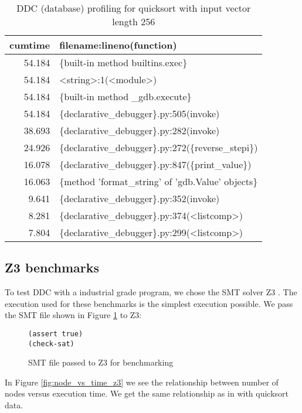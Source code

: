 \begin{table}
\caption{DDC (database) profiling for quicksort with input vector length 256}
\label{table:DDC_profile}
\begin{tabular}{rl}
cumtime & filename:lineno(function)\\
\hline
54.184 & \{built-in method builtins.exec\}\\
54.184 & <string>:1(<module>)\\
54.184 & \{built-in method \_gdb.execute\}\\
54.184 & \{declarative\_debugger\}.py:505(invoke)\\
38.693 & \{declarative\_debugger\}.py:282(invoke)\\
24.926 & \{declarative\_debugger\}.py:272(\{reverse\_stepi\})\\
16.078 & \{declarative\_debugger\}.py:847(\{print\_value\})\\
16.063 & \{method 'format\_string'  of 'gdb.Value'  objects\}\\
9.641 & \{declarative\_debugger\}.py:352(invoke)\\
8.281 & \{declarative\_debugger\}.py:374(<listcomp>)\\
7.804 & \{declarative\_debugger\}.py:299(<listcomp>)\\
\end{tabular}
\end{table}

\subsection{Z3 benchmarks}
To test DDC with a industrial grade program, we chose the SMT solver Z3 \cite{z3}.
The execution used for these benchmarks is the simplest execution possible.
We pass the SMT file shown in Figure \ref{fig:SMT_file} to Z3:
\begin{figure}[htbp]
    \centering
    \caption{SMT file passed to Z3 for benchmarking}
    \label{fig:SMT_file}
    \begin{verbatim}
(assert true)
(check-sat)
    \end{verbatim}
\end{figure}

In Figure \ref{fig:node_vs_time_z3} we see the relationship between number of nodes versus execution time. We get the same relationship as in with quicksort data.

